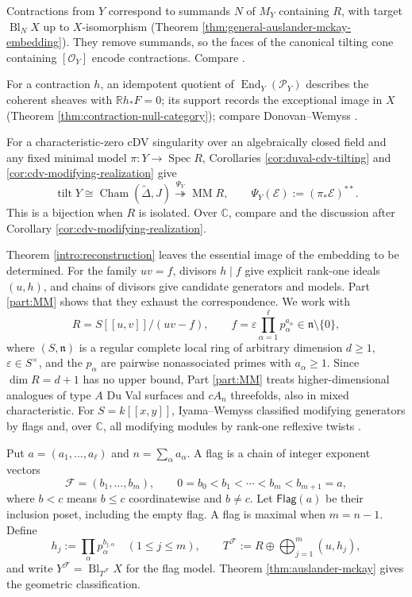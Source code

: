 \documentclass[a4paper,reqno]{amsart}
\def\E{\mathcal{E}}
\def\F{\mathcal{F}}
\def\O{\mathcal{O}}
\def\P{\mathcal{P}}
\def\n{\mathfrak{n}}
\DeclareMathOperator{\End}{End}
\DeclareMathOperator{\Spec}{Spec}
\DeclareMathOperator{\tilt}{tilt}
\DeclareMathOperator{\MM}{MM}
\theoremstyle{definition}
\begin{document}
Contractions from $Y$ correspond to summands $N$ of $M_Y$ containing $R$, with target $\operatorname{Bl}_N X$ up to $X$-isomorphism (Theorem \ref{thm:general-auslander-mckay-embedding}). They remove summands, so the faces of the canonical tilting cone containing $[\O_Y]$ encode contractions. Compare \cite[Corollary 4.4]{Wem18}.

For a contraction $h$, an idempotent quotient of $\End_Y(\P_Y)$ describes the coherent sheaves with $\mathbb Rh_*F=0$; its support records the exceptional image in $X$ (Theorem \ref{thm:contraction-null-category}); compare Donovan--Wemyss \cite{DW19contractions}.

For a characteristic-zero cDV singularity over an algebraically closed field and any fixed minimal model $\pi\colon Y\to\Spec R$, Corollaries \ref{cor:duval-cdv-tilting} and \ref{cor:cdv-modifying-realization} give
\[
\tilt Y\cong\operatorname{Cham}(\widetilde\Delta,J)
\overset{\Psi_Y}{\twoheadrightarrow}\MM R,
\qquad \Psi_Y(\E):=(\pi_*\E)^{**}.
\]
This is a bijection when $R$ is isolated. Over $\mathbb C$, compare \cite[Theorem 0.13]{IWTC} and the discussion after Corollary \ref{cor:cdv-modifying-realization}.

Theorem \ref{intro:reconstruction} leaves the essential image of the embedding to be determined. For the family $uv=f$, divisors $h\mid f$ give explicit rank-one ideals $(u,h)$, and chains of divisors give candidate generators and models. Part \ref{part:MM} shows that they exhaust the correspondence. We work with
\[
R=S[[u,v]]/(uv-f),\qquad
f=\varepsilon\prod_{\alpha=1}^{\ell}p_\alpha^{a_\alpha}\in\n\setminus\{0\},
\]
where $(S,\n)$ is a regular complete local ring of arbitrary dimension $d\ge1$, $\varepsilon\in S^\times$, and the $p_\alpha$ are pairwise nonassociated primes with $a_\alpha\ge1$. Since $\dim R=d+1$ has no upper bound, Part \ref{part:MM} treats higher-dimensional analogues of type $A$ Du Val surfaces and $cA_n$ threefolds, also in mixed characteristic. For $S=k[[x,y]]$, Iyama--Wemyss classified modifying generators by flags and, over $\mathbb C$, all modifying modules by rank-one reflexive twists \cite[Theorem 5.1, Lemma 5.22 and Proposition 5.24]{IW18}.

Put $a=(a_1,\ldots,a_\ell)$ and $n=\sum_\alpha a_\alpha$. A flag is a chain of integer exponent vectors
\[
\F=(b_1,\ldots,b_m),\qquad
0=b_0<b_1<\cdots<b_m<b_{m+1}=a,
\]
where $b<c$ means $b\le c$ coordinatewise and $b\ne c$. Let $\mathsf{Flag}(a)$ be their inclusion poset, including the empty flag. A flag is maximal when $m=n-1$. Define
\[
h_j:=\prod_\alpha p_\alpha^{b_{j,\alpha}}\quad(1\le j\le m),\qquad
T^\F:=R\oplus\bigoplus_{j=1}^{m}(u,h_j),
\]
and write $Y^\F=\operatorname{Bl}_{T^\F}X$ for the flag model. Theorem \ref{thm:auslander-mckay} gives the geometric classification.
\end{document}

